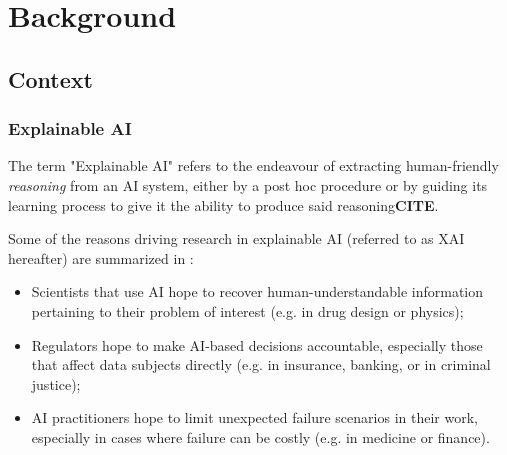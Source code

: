\documentclass[../main.tex]{subfiles}
\begin{document}
\chapter{Background}
\label{ch:background}


\newcommand{\keyword}[1]{\textbf{#1}}
\newcommand{\tabhead}[1]{\textbf{#1}}
\newcommand{\code}[1]{\texttt{#1}}
\newcommand{\file}[1]{\texttt{\bfseries#1}}
\newcommand{\option}[1]{\texttt{\itshape#1}}

\newcommand{\method}[1]{\texttt{#1}}
\newcommand{\note}[1]{\textbf{#1}}
\newcommand{\citenote}{\note{CITE}}

\newcommand{\CF}[1]{#1^\text{CF}}
\newcommand{\target}{\text{target}}


\section{Context}

\subsection{Explainable AI}

The term "Explainable AI" refers to the endeavour of extracting human-friendly \emph{reasoning} from an AI system, either by a post hoc procedure or by guiding its learning process to give it the ability to produce said reasoning\citenote{}.

Some of the reasons driving research in explainable AI (referred to as XAI hereafter) are summarized in \cite{zhangSurvey2021}:
\begin{itemize}
    \item Scientists that use AI hope to recover human-understandable information pertaining to their problem of interest (e.g. in drug design or physics);
    \item Regulators hope to make AI-based decisions accountable, especially those that affect data subjects directly (e.g. in insurance, banking, or in criminal justice);
    \item AI practitioners hope to limit unexpected failure scenarios in their work, especially in cases where failure can be costly (e.g. in medicine or finance).
\end{itemize}
\end{document}
